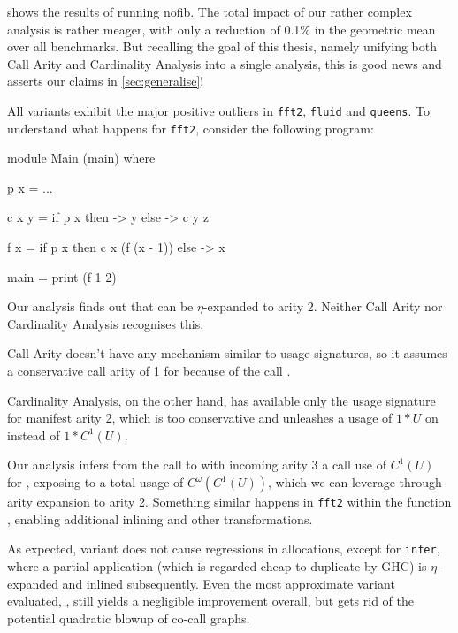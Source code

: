  shows the results of running nofib.
The total impact of our rather complex analysis is rather meager, with only a reduction of 0.1\% in the geometric mean over all benchmarks.
But recalling the goal of this thesis, namely unifying both Call Arity \parencite{callarity} and Cardinality Analysis \parencite{card} into a single analysis, this is good news and asserts our claims in \cref{sec:generalise}!\smallskip

All variants exhibit the major positive outliers in \texttt{fft2}, \texttt{fluid} and \texttt{queens}.
To understand what happens for \texttt{fft2}, consider the following program:
\begin{haskellcode}
  module Main (main) where

  p x = ...

  c x y = 
    if p x 
    then \z -> y 
    else \z -> c y z
  
  f x = 
    if p x 
    then c x (f (x - 1))
    else \z -> x

  main = 
    print (f 1 2)
\end{haskellcode}

Our analysis finds out that  can be $\eta$-expanded to arity 2.
Neither Call Arity nor Cardinality Analysis recognises this.

Call Arity doesn't have any mechanism similar to usage signatures, so it assumes a conservative call arity of 1 for  because of the call .

Cardinality Analysis, on the other hand, has available only the usage signature for manifest arity 2, which is too conservative and unleashes a usage of $1*U$ on  instead of $1*C^1(U)$.

Our analysis infers from the call to  with incoming arity 3 a call use of $C^1(U)$ for , exposing  to a total usage of $C^\omega(C^1(U))$, which we can leverage through arity expansion to arity 2.
Something similar happens in \texttt{fft2} within the function , enabling additional inlining and other transformations. \smallskip

As expected, variant \varfull does not cause regressions in allocations, except for \texttt{infer}, where a partial application (which is regarded cheap to duplicate by GHC) is $\eta$-expanded and inlined subsequently.
Even the most approximate variant evaluated, \varedges, still yields a negligible improvement overall, but gets rid of the potential quadratic blowup of co-call graphs.

